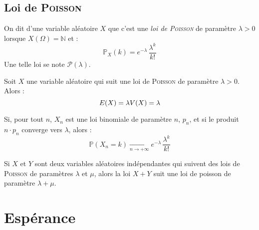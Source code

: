 \documentclass[11pt,a4paper,fleqn,pdftex]{report}
\begin{document}
\subsection{Loi de \textsc{Poisson}} %
\label{sub:loi_de_poisson}
\begin{dfn}
     On dit d'une variable aléatoire $X$ que c'est une \emph{loi de \textsc{Poisson}} de paramètre $\lambda >0$ lorsque $X( \Omega ) = \mathbb{N}$ et :
     \begin{equation}
     \mathbb{P}_X (k) = e^{-\lambda}\, \dfrac{\lambda^k}{k !}
     \end{equation}
     Une telle loi se note $\mathscr{P}(\lambda )$.
\end{dfn}
\begin{theorem}
     Soit $X$ une variable aléatoire qui suit une loi de \textsc{Poisson} de paramètre $\lambda > 0$. Alors :
     \begin{equation}
     E(X) = \lambda \\ V(X) = \lambda
     \end{equation}
\end{theorem}
\begin{theorem}
     Si, pour tout $n$, $X_n$ est une loi binomiale de paramètre $n$, $p_n$, et si le produit $n\cdot p_n$ converge vers $\lambda$, alors :
     \begin{equation}
     \mathbb{P}(X_n = k) \xrightarrow[n\to+\infty]{} e^{-\lambda}\, \dfrac{\lambda^k}{k!}
     \end{equation}
\end{theorem}
\begin{prop}
     Si $X$ et $Y$ sont deux variables aléatoires indépendantes qui suivent des lois de \textsc{Poisson} de paramètres $\lambda$ et $\mu$, alors la loi $X+Y$ suit une loi de poisson de paramètre $\lambda + \mu$.
\end{prop}
\section{Espérance} %
\label{sec:esperance}
\end{document}
